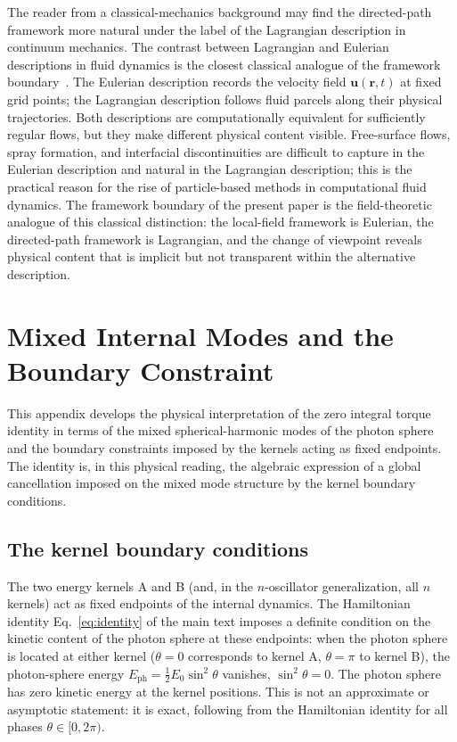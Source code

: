 \documentclass[%
 reprint, amsmath,amssymb, aps, prb, ]{revtex4-2}
\numberwithin{equation}{section}
\newcommand{\EphS}{E_{\text{ph}}}
\begin{document}
The reader from a classical-mechanics background may find the directed-path framework more natural under the label of the Lagrangian description in continuum mechanics. The contrast between Lagrangian and Eulerian descriptions in fluid dynamics is the closest classical analogue of the framework boundary~\cite{hanamura55}. The Eulerian description records the velocity field $\mathbf{u}(\mathbf{r}, t)$ at fixed grid points; the Lagrangian description follows fluid parcels along their physical trajectories. Both descriptions are computationally equivalent for sufficiently regular flows, but they make different physical content visible. Free-surface flows, spray formation, and interfacial discontinuities are difficult to capture in the Eulerian description and natural in the Lagrangian description; this is the practical reason for the rise of particle-based methods in computational fluid dynamics. The framework boundary of the present paper is the field-theoretic analogue of this classical distinction: the local-field framework is Eulerian, the directed-path framework is Lagrangian, and the change of viewpoint reveals physical content that is implicit but not transparent within the alternative description.


\section{Mixed Internal Modes and the Boundary Constraint}
\label{app:modes}

This appendix develops the physical interpretation of the zero integral torque identity in terms of the mixed spherical-harmonic modes of the photon sphere and the boundary constraints imposed by the kernels acting as fixed endpoints. The identity is, in this physical reading, the algebraic expression of a global cancellation imposed on the mixed mode structure by the kernel boundary conditions.

\subsection{The kernel boundary conditions}
\label{sec:kernel_boundary}

The two energy kernels A and B (and, in the $n$-oscillator generalization, all $n$ kernels) act as fixed endpoints of the internal dynamics. The Hamiltonian identity Eq.~\eqref{eq:identity} of the main text imposes a definite condition on the kinetic content of the photon sphere at these endpoints: when the photon sphere is located at either kernel ($\theta = 0$ corresponds to kernel A, $\theta = \pi$ to kernel B), the photon-sphere energy $\EphS = \tfrac{1}{2}E_0\sin^2\theta$ vanishes, $\sin^2\theta = 0$. The photon sphere has zero kinetic energy at the kernel positions. This is not an approximate or asymptotic statement: it is exact, following from the Hamiltonian identity for all phases $\theta \in [0, 2\pi)$.
\end{document}
